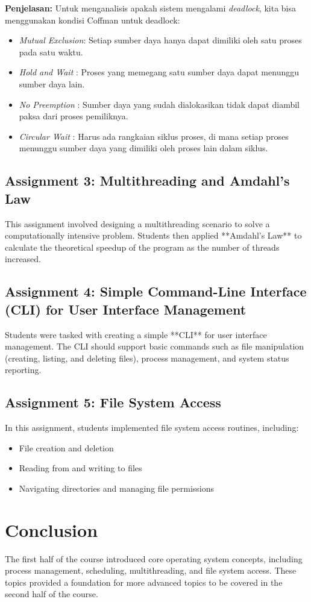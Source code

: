\documentclass[12pt]{article}
\begin{document}
\noindent
\textbf{Penjelasan:}
Untuk menganalisis apakah sistem mengalami \textit{deadlock}, kita bisa menggunakan kondisi Coffman untuk deadlock:
\begin{itemize}
    \item \textit{Mutual Exclusion}: Setiap sumber daya hanya dapat dimiliki oleh satu proses pada satu waktu.
    \item \textit{Hold and Wait} : Proses yang memegang satu sumber daya dapat menunggu sumber daya lain.
    \item \textit{No Preemption} : Sumber daya yang sudah dialokasikan tidak dapat diambil paksa dari proses pemiliknya.
    \item \textit{Circular Wait} : Harus ada rangkaian siklus proses, di mana setiap proses menunggu sumber daya yang dimiliki oleh proses lain dalam siklus.
\end{itemize}

\subsection{Assignment 3: Multithreading and Amdahl's Law}
This assignment involved designing a multithreading scenario to solve a computationally intensive problem. Students then applied **Amdahl's Law** to calculate the theoretical speedup of the program as the number of threads increased.

\subsection{Assignment 4: Simple Command-Line Interface (CLI) for User Interface Management}
Students were tasked with creating a simple **CLI** for user interface management. The CLI should support basic commands such as file manipulation (creating, listing, and deleting files), process management, and system status reporting.

\subsection{Assignment 5: File System Access}
In this assignment, students implemented file system access routines, including:
\begin{itemize}
    \item File creation and deletion
    \item Reading from and writing to files
    \item Navigating directories and managing file permissions
\end{itemize}

\section{Conclusion}
The first half of the course introduced core operating system concepts, including process management, scheduling, multithreading, and file system access. These topics provided a foundation for more advanced topics to be covered in the second half of the course.
\end{document}
